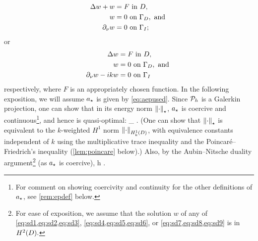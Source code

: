 \begin{align}
  \Delta w + w&= F \text{ in } D,\label{eq:sd4}\\
  w &= 0 \text{ on } \Gamma_{D},\text{ and }\label{eq:sd5}\\
  \partial_{\nu} w &= 0 \text{ on } \Gamma_{I};\label{eq:sd6}
\end{align}
or
\begin{align}
  \Delta w &= F \text{ in } D,\label{eq:sd7}\\
  w &= 0 \text{ on } \Gamma_{D},\text{ and }\label{eq:sd8}\\
  \partial_{\nu} w -ikw &= 0 \text{ on } \Gamma_{I}\label{eq:sd9}
\end{align}
respectively, where $F$ is an appropriately chosen function. In the following exposition, we will assume $a_{\star}$ is given by \cref{eq:aepused}.
Since $\mathcal P_{h}$ is a Galerkin projection, one can show that in its energy norm $\Nep{\cdot}$, $a_{\star}$ is coercive and continuous\footnote{For comment on showing coercivity and continuity for the other definitions of $a_{\star}$, see \cref{rem:epdef} below.}, and hence is quasi-optimal:
\beq\label{eq:epho}
 \lesssim \inf_{\vh \in \Vhp} .
\eeq
(One can show that $\Nep{\cdot}$ is equivalent to the $k$-weighted $H^1$ norm $\NHokD{\cdot}$, with equivalence constants independent of $k$ using the multiplicative trace inequality and the Poincar\'e--Friedrich's inequality (\cref{lem:poincare} below).) Also, by the Aubin--Nitsche duality argument\footnote{For ease of exposition, we assume that the solution $w$ of any of \cref{eq:sd1,eq:sd2,eq:sd3}, \cref{eq:sd4,eq:sd5,eq:sd6}, or \cref{eq:sd7,eq:sd8,eq:sd9} is in $\HtD.$} (as $a_{\star}$ is coercive),
\beq\label{eq:eplt}
 \lesssim h .
\eeq
{}

